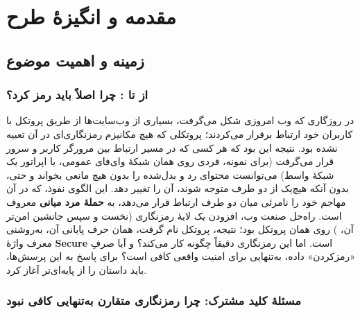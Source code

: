 \chapter{مقدمه و انگیزهٔ طرح}
\label{chap:introduction}

\section{زمینه و اهمیت موضوع}
\label{sec:motivation}

\subsection{از  تا : چرا اصلاً باید رمز کرد؟}

در روزگاری که وب امروزی شکل می‌گرفت، بسیاری از وب‌سایت‌ها از طریق پروتکل  با کاربران خود ارتباط برقرار می‌کردند؛ پروتکلی که هیچ مکانیزم رمزنگاری‌ای در آن تعبیه نشده بود. نتیجه این بود که هر کسی که در مسیر ارتباط بین مرورگر کاربر و سرور قرار می‌گرفت (برای نمونه، فردی روی همان شبکهٔ وای‌فای عمومی، یا اپراتور یک شبکهٔ واسط) می‌توانست محتوای رد و بدل‌شده را بدون هیچ مانعی بخواند و حتی، بدون آنکه هیچ‌یک از دو طرف متوجه شوند، آن را تغییر دهد. این الگوی نفوذ، که در آن مهاجم خود را نامرئی میان دو طرف ارتباط قرار می‌دهد، به \textbf{حملهٔ مرد میانی}  معروف است. راه‌حل صنعت وب، افزودن یک لایهٔ رمزنگاری (نخست  و سپس جانشین امن‌تر آن، ) روی همان پروتکل بود؛ نتیجه، پروتکل  نام گرفت، همان حرف  پایانی آن، به‌روشنی معرف واژهٔ \textbf{Secure} است. اما این رمزنگاری دقیقاً چگونه کار می‌کند؟ و آیا صرفِ «رمزکردن» داده، به‌تنهایی برای امنیت واقعی کافی است؟ برای پاسخ به این پرسش‌ها، باید داستان را از پایه‌ای‌تر آغاز کرد.

\subsection{مسئلهٔ کلید مشترک: چرا رمزنگاری متقارن به‌تنهایی کافی نبود}

